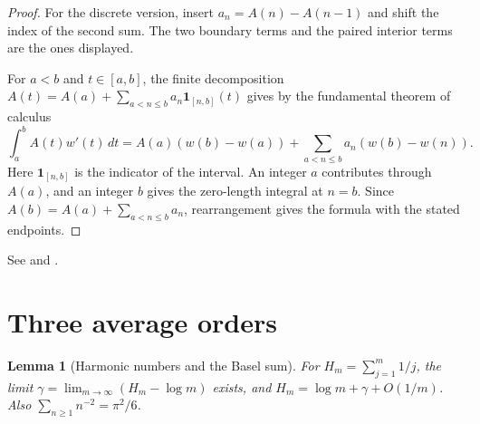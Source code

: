 \documentclass[11pt,oneside,openany]{book}
\theoremstyle{plain}
\newtheorem{lemma}[theorem]{Lemma}
\theoremstyle{definition}
\theoremstyle{remark}
\begin{document}
\begin{proof}
For the discrete version, insert \(a_n=A(n)-A(n-1)\) and shift the
index of the second sum. The two boundary terms and the paired
interior terms are the ones displayed.

For \(a<b\) and \(t\in[a,b]\), the finite decomposition
\(A(t)=A(a)+\sum_{a<n\le b}a_n\mathbf{1}_{[n,b]}(t)\)
gives by the fundamental theorem of calculus
\[
 \int_a^b A(t)w'(t)\,dt
 =A(a)(w(b)-w(a))
   +\sum_{a<n\le b}a_n(w(b)-w(n)).
\]
Here \(\mathbf{1}_{[n,b]}\) is the indicator of the interval. An integer
\(a\) contributes through \(A(a)\), and an integer \(b\) gives the
zero-length integral at \(n=b\). Since
\(A(b)=A(a)+\sum_{a<n\le b}a_n\), rearrangement gives the formula with
the stated endpoints.
\end{proof}

See \cite[Theorems 3.17 and 4.2]{apostol} and
\cite[Chapters 2--3]{gkp}.

\section{Three average orders}

\begin{lemma}[Harmonic numbers and the Basel sum]
For \(H_m=\sum_{j=1}^m1/j\), the limit
\(\gamma=\lim_{m\to\infty}(H_m-\log m)\) exists, and
\(H_m=\log m+\gamma+O(1/m)\). Also
\(\sum_{n\ge1}n^{-2}=\pi^2/6\).
\end{lemma}
\end{document}
